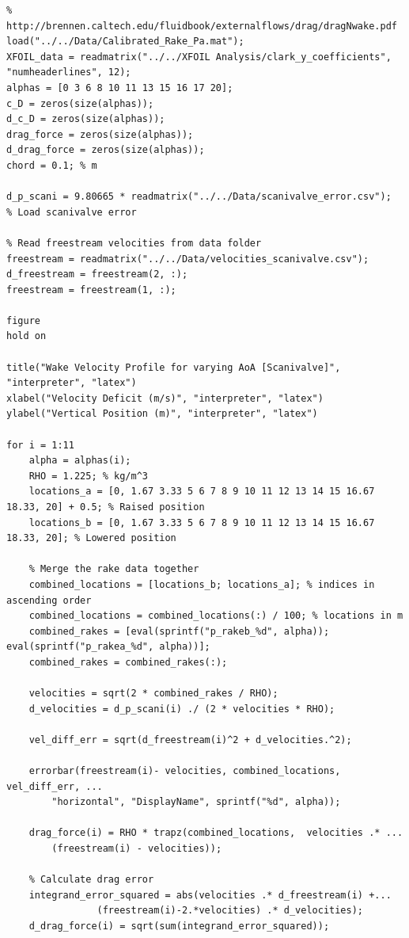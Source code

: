 \documentclass[runningheads]{llncs}
\begin{document}
\begin{verbatim}
% http://brennen.caltech.edu/fluidbook/externalflows/drag/dragNwake.pdf
load("../../Data/Calibrated_Rake_Pa.mat");
XFOIL_data = readmatrix("../../XFOIL Analysis/clark_y_coefficients", "numheaderlines", 12);
alphas = [0 3 6 8 10 11 13 15 16 17 20];
c_D = zeros(size(alphas));
d_c_D = zeros(size(alphas));
drag_force = zeros(size(alphas));
d_drag_force = zeros(size(alphas));
chord = 0.1; % m

d_p_scani = 9.80665 * readmatrix("../../Data/scanivalve_error.csv");
% Load scanivalve error

% Read freestream velocities from data folder
freestream = readmatrix("../../Data/velocities_scanivalve.csv");
d_freestream = freestream(2, :);
freestream = freestream(1, :);

figure
hold on

title("Wake Velocity Profile for varying AoA [Scanivalve]", "interpreter", "latex")
xlabel("Velocity Deficit (m/s)", "interpreter", "latex")
ylabel("Vertical Position (m)", "interpreter", "latex")

for i = 1:11
    alpha = alphas(i);
    RHO = 1.225; % kg/m^3
    locations_a = [0, 1.67 3.33 5 6 7 8 9 10 11 12 13 14 15 16.67 18.33, 20] + 0.5; % Raised position
    locations_b = [0, 1.67 3.33 5 6 7 8 9 10 11 12 13 14 15 16.67 18.33, 20]; % Lowered position

    % Merge the rake data together
    combined_locations = [locations_b; locations_a]; % indices in ascending order
    combined_locations = combined_locations(:) / 100; % locations in m
    combined_rakes = [eval(sprintf("p_rakeb_%d", alpha)); eval(sprintf("p_rakea_%d", alpha))];
    combined_rakes = combined_rakes(:);

    velocities = sqrt(2 * combined_rakes / RHO);
    d_velocities = d_p_scani(i) ./ (2 * velocities * RHO);
    
    vel_diff_err = sqrt(d_freestream(i)^2 + d_velocities.^2);

    errorbar(freestream(i)- velocities, combined_locations, vel_diff_err, ...
        "horizontal", "DisplayName", sprintf("%d", alpha));
    
    drag_force(i) = RHO * trapz(combined_locations,  velocities .* ...
        (freestream(i) - velocities));
    
    % Calculate drag error
    integrand_error_squared = abs(velocities .* d_freestream(i) +...
                (freestream(i)-2.*velocities) .* d_velocities);
    d_drag_force(i) = sqrt(sum(integrand_error_squared));
    

\end{verbatim}
\end{document}
